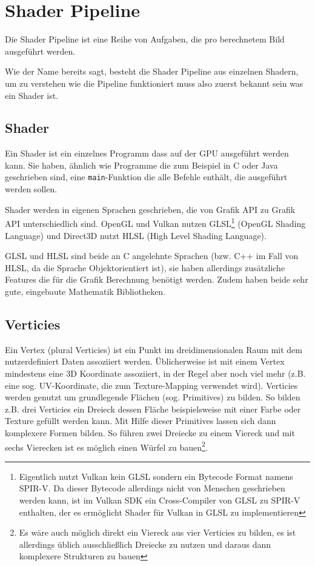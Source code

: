 
\section{Shader Pipeline}

Die Shader Pipeline ist eine Reihe von Aufgaben, die pro berechnetem Bild ausgeführt werden. 

Wie der Name bereits sagt, besteht die Shader Pipeline aus einzelnen Shadern, um zu verstehen wie die Pipeline funktioniert muss also zuerst bekannt sein was ein Shader ist.

\subsection{Shader}
Ein Shader ist ein einzelnes Programm dass auf der GPU ausgeführt werden kann. Sie haben, ähnlich wie Programme die zum Beispiel in C oder Java geschrieben sind, eine \texttt{main}-Funktion die alle Befehle enthält, die ausgeführt werden sollen.

Shader werden in eigenen Sprachen geschrieben, die von Grafik API zu Grafik API unterschiedlich sind. OpenGL und Vulkan nutzen GLSL\footnote{Eigentlich nutzt Vulkan kein GLSL sondern ein Bytecode Format namens SPIR-V. Da dieser Bytecode allerdings nicht von Menschen geschrieben werden kann, ist im Vulkan SDK ein Cross-Compiler von GLSL zu SPIR-V enthalten, der es ermöglicht Shader für Vulkan in GLSL zu implementieren} (OpenGL Shading Language) und Direct3D nutzt HLSL (High Level Shading Language).

GLSL und HLSL sind beide an C angelehnte Sprachen (bzw. C++ im Fall von HLSL, da die Sprache Objektorientiert ist), sie haben allerdings zusätzliche Features die für die Grafik Berechnung benötigt werden. Zudem haben beide sehr gute, eingebaute Mathematik Bibliotheken.


\subsection{Verticies}
Ein Vertex (plural Verticies) ist ein Punkt im dreidimensionalen Raum mit dem nutzerdefiniert Daten assoziiert werden. Üblicherweise ist mit einem Vertex mindestens eine 3D Koordinate assoziiert, in der Regel aber noch viel mehr (z.B. eine sog. UV-Koordinate, die zum Texture-Mapping verwendet wird). Verticies werden genutzt um grundlegende Flächen (sog. Primitives) zu bilden. So bilden z.B. drei Verticies ein Dreieck dessen Fläche beispielsweise mit einer Farbe oder Texture gefüllt werden kann. Mit Hilfe dieser Primitives lassen sich dann komplexere Formen bilden. So führen zwei Dreiecke zu einem Viereck und mit sechs Vierecken ist es möglich einen Würfel zu bauen\footnote{Es wäre auch möglich direkt ein Viereck aus vier Verticies zu bilden, es ist allerdings üblich ausschließlich Dreiecke zu nutzen und daraus dann komplexere Strukturen zu bauen}.


